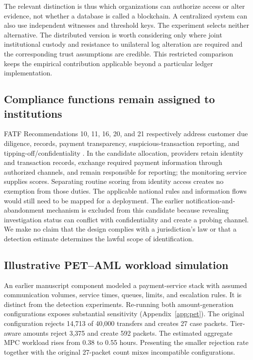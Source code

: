 \documentclass[11pt,a4paper]{article}
\begin{document}
The relevant distinction is thus which organizations can authorize access or alter evidence, not whether a database is called a blockchain. A centralized system can also use independent witnesses and threshold keys. The experiment selects neither alternative. The distributed version is worth considering only where joint institutional custody and resistance to unilateral log alteration are required and the corresponding trust assumptions are credible. This restricted comparison keeps the empirical contribution applicable beyond a particular ledger implementation.

\subsection{Compliance functions remain assigned to institutions}
FATF Recommendations 10, 11, 16, 20, and 21 respectively address customer due diligence, records, payment transparency, suspicious-transaction reporting, and tipping-off/confidentiality \citep{FATF}. In the candidate allocation, providers retain identity and transaction records, exchange required payment information through authorized channels, and remain responsible for reporting; the monitoring service supplies scores. Separating routine scoring from identity access creates no exemption from those duties. The applicable national rules and information flows would still need to be mapped for a deployment. The earlier notification-and-abandonment mechanism is excluded from this candidate because revealing investigation status can conflict with confidentiality and create a probing channel. We make no claim that the design complies with a jurisdiction's law or that a detection estimate determines the lawful scope of identification.

\subsection{Illustrative PET--AML workload simulation}
An earlier manuscript component modeled a payment-service stack with assumed communication volumes, service times, queues, limits, and escalation rules. It is distinct from the detection experiments. Re-running both amount-generation configurations exposes substantial sensitivity (Appendix~\ref{app:pet}). The original configuration rejects 14,713 of 40,000 transfers and creates 27 case packets. Tier-aware amounts reject 3,375 and create 592 packets. The estimated aggregate MPC workload rises from 0.38 to 0.55 hours. Presenting the smaller rejection rate together with the original 27-packet count mixes incompatible configurations.
\end{document}
